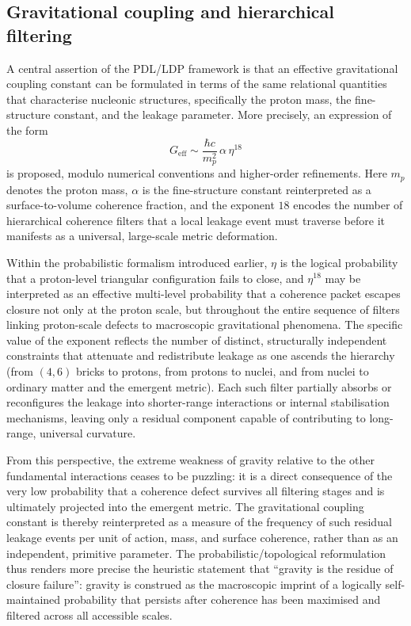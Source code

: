\documentclass[11pt,a4paper]{article}
\theoremstyle{definition}
\newcommand{\etaL}{\eta} %
\begin{document}
\subsection{Gravitational coupling and hierarchical filtering}

A central assertion of the PDL/LDP framework is that an effective gravitational coupling constant can be formulated in terms of the same relational quantities that characterise nucleonic structures, specifically the proton mass, the fine-structure constant, and the leakage parameter. More precisely, an expression of the form
\[
 G_{\mathrm{eff}} \sim \frac{\hbar c}{m_p^2} \, \alpha \, \etaL^{18}
\]
is proposed, modulo numerical conventions and higher-order refinements. Here \(m_p\) denotes the proton mass, \(\alpha\) is the fine-structure constant reinterpreted as a surface-to-volume coherence fraction, and the exponent \(18\) encodes the number of hierarchical coherence filters that a local leakage event must traverse before it manifests as a universal, large-scale metric deformation.

Within the probabilistic formalism introduced earlier, \(\etaL\) is the logical probability that a proton-level triangular configuration fails to close, and \(\etaL^{18}\) may be interpreted as an effective multi-level probability that a coherence packet escapes closure not only at the proton scale, but throughout the entire sequence of filters linking proton-scale defects to macroscopic gravitational phenomena. The specific value of the exponent reflects the number of distinct, structurally independent constraints that attenuate and redistribute leakage as one ascends the hierarchy (from \((4,6)\) bricks to protons, from protons to nuclei, and from nuclei to ordinary matter and the emergent metric). Each such filter partially absorbs or reconfigures the leakage into shorter-range interactions or internal stabilisation mechanisms, leaving only a residual component capable of contributing to long-range, universal curvature.

From this perspective, the extreme weakness of gravity relative to the other fundamental interactions ceases to be puzzling: it is a direct consequence of the very low probability that a coherence defect survives all filtering stages and is ultimately projected into the emergent metric. The gravitational coupling constant is thereby reinterpreted as a measure of the frequency of such residual leakage events per unit of action, mass, and surface coherence, rather than as an independent, primitive parameter. The probabilistic/topological reformulation thus renders more precise the heuristic statement that ``gravity is the residue of closure failure'': gravity is construed as the macroscopic imprint of a logically self-maintained probability that persists after coherence has been maximised and filtered across all accessible scales.
\end{document}
